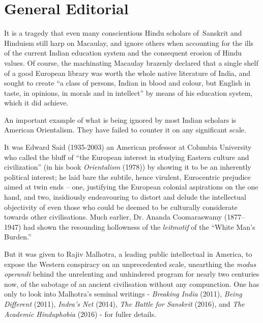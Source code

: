 \chapter*{General Editorial}\label{gen_editorial}

It is a tragedy that even many conscientious Hindu scholars of~Sanskrit and Hinduism still harp on Macaulay, and ignore others when accounting for the ills of the current Indian education system and the consequent erosion of Hindu values. Of course, the machinating Macaulay brazenly declared that a single shelf of a good European library was worth the whole native literature of India, and sought to create “a class of persons, Indian in blood and colour, but English in taste, in opinions, in morals and in intellect” by means of his education system, which it did achieve. 

An important example of what is being ignored by most Indian scholars is American Orientalism. They have failed to counter it on any significant scale. 

It was Edward Said (1935-2003) an American professor at Columbia University who called the bluff of “the European interest in studying Eastern culture and civilization” (in his book {\sl Orientalism} (1978)) by showing it to be an inherently political interest; he laid bare the subtile, hence virulent, Eurocentric prejudice aimed at twin ends – one, justifying the European colonial aspirations  on the one hand, and two, insidiously endeavouring to distort  and delude the intellectual objectivity of even those who could be deemed to be culturally considerate towards other civilisations. Much earlier, Dr. Ananda Coomaraswamy (1877--1947) had shown the resounding hollowness of the {\sl leitmotif} of the “White Man’s Burden.” 

But it was given to Rajiv Malhotra, a leading public intellectual in America, to expose the Western conspiracy on an unprecedented scale, unearthing the {\sl modus operandi} behind the unrelenting and unhindered program for nearly two centuries now, of the sabotage of an ancient civilisation without any compunction.  One has only to look into Malhotra’s seminal writings - {\sl Breaking India} (2011), {\sl Being Different} (2011), {\sl Indra’s Net} (2014), {\sl The Battle for Sanskrit} (2016), and {\sl The Academic Hinduphobia} (2016) - for fuller details.
\vskip 1.5pt

